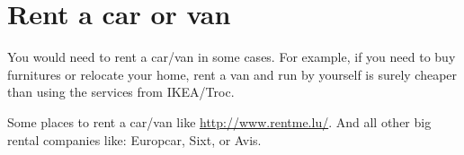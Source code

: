 \section{Rent a car or van}
You would need to rent a car/van in some cases. 
For example, if you need to buy furnitures or relocate your home, rent a van and run by yourself is surely cheaper than using the services from IKEA/Troc. 
 
Some places to rent a car/van like \url{http://www.rentme.lu/}. And all other big rental companies like:
Europcar, Sixt, or Avis.
